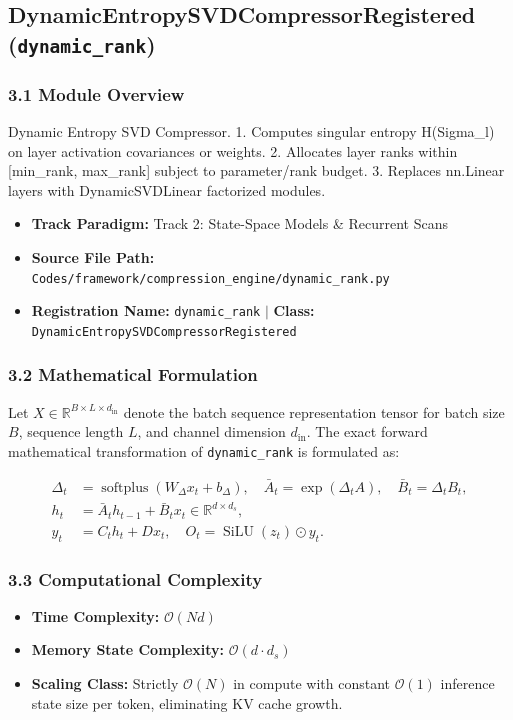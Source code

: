 \subsection{DynamicEntropySVDCompressorRegistered (\texttt{dynamic\_rank})}
\label{sec:app_module_dynamic\_rank}

\subsubsection*{3.1 Module Overview}
Dynamic Entropy SVD Compressor.  1. Computes singular entropy H(Sigma\_l) on layer activation covariances or weights. 2. Allocates layer ranks within [min\_rank, max\_rank] subject to parameter/rank budget. 3. Replaces nn.Linear layers with DynamicSVDLinear factorized modules.
\begin{itemize}
    \item \textbf{Track Paradigm:} Track 2: State-Space Models & Recurrent Scans
    \item \textbf{Source File Path:} \texttt{Codes/framework/compression\_engine/dynamic\_rank.py}
    \item \textbf{Registration Name:} \texttt{dynamic\_rank} $\mid$ \textbf{Class:} \texttt{DynamicEntropySVDCompressorRegistered}
\end{itemize}

\subsubsection*{3.2 Mathematical Formulation}
Let $X \in \mathbb{R}^{B \times L \times d_{\text{in}}}$ denote the batch sequence representation tensor for batch size $B$, sequence length $L$, and channel dimension $d_{\text{in}}$. The exact forward mathematical transformation of \texttt{dynamic\_rank} is formulated as:

\begin{align}
\Delta_t &= \operatorname{softplus}(W_\Delta x_t + b_\Delta), \quad \bar{A}_t = \exp(\Delta_t A), \quad \bar{B}_t = \Delta_t B_t, \\
h_t &= \bar{A}_t h_{t-1} + \bar{B}_t x_t \in \mathbb{R}^{d \times d_s}, \\
y_t &= C_t h_t + D x_t, \quad O_t = \operatorname{SiLU}(z_t) \odot y_t.
\end{align}


\subsubsection*{3.3 Computational Complexity}
\begin{itemize}
    \item \textbf{Time Complexity:} $\mathcal{O}(N d)$
    \item \textbf{Memory State Complexity:} $\mathcal{O}(d \cdot d_s)$
    \item \textbf{Scaling Class:} Strictly $\mathcal{O}(N)$ in compute with constant $\mathcal{O}(1)$ inference state size per token, eliminating KV cache growth.
\end{itemize}

